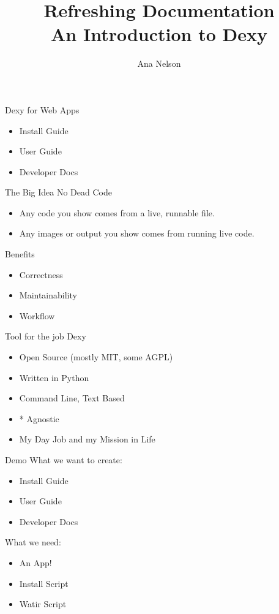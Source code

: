 \documentclass{beamer}
\title[Refreshing Docs]{Refreshing Documentation\\An Introduction to Dexy}
\author{Ana Nelson}
\institute{dexy.it}
\begin{document}
\begin{frame}
\titlepage
\end{frame}

\begin{frame}{Dexy for Web Apps}
\begin{itemize}
\item{Install Guide}
\pause
\item{User Guide}
\pause
\item{Developer Docs}
\end{itemize}
\end{frame}

\begin{frame}{The Big Idea}
No Dead Code
\begin{itemize}
\item{Any code you show comes from a live, runnable file.}
\item{Any images or output you show comes from running live code.}
\end{itemize}
\end{frame}

\begin{frame}{Benefits}
\begin{itemize}
\item{Correctness}
\item{Maintainability}
\item{Workflow}
\end{itemize}
\end{frame}

\begin{frame}{Tool for the job}
Dexy
\begin{itemize}
\item{Open Source (mostly MIT, some AGPL)}
\item{Written in Python}
\item{Command Line, Text Based}
\item{* Agnostic}
\item{My Day Job and my Mission in Life}
\end{itemize}
\end{frame}

\begin{frame}{Demo}
What we want to create:
\begin{itemize}
\item{Install Guide}
\item{User Guide}
\item{Developer Docs}
\end{itemize}

What we need:
\begin{itemize}
\item{An App!}
\item{Install Script}
\item{Watir Script}
\end{itemize}
\end{frame}
\end{document}
